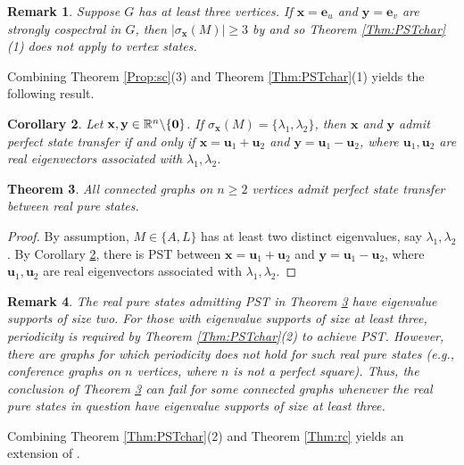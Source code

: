 \documentclass[11pt]{article}
\newtheorem{theorem}{Theorem}
\newtheorem{corollary}[theorem]{Corollary}
\newtheorem{remark}[theorem]{Remark}
\newcommand{\zero}{{\bf{0}}}
\newcommand{\be}{\mathbf e}
\newcommand{\bx}{\mathbf x}
\newcommand{\by}{\mathbf y}
\newcommand{\bu}{\mathbf u}
\def\R{\mathbb{R}}
\begin{document}
\begin{remark}
Suppose $G$ has at least three vertices. If $\bx=\be_u$ and $\by=\be_v$ are strongly cospectral in $G$, then $|\sigma_{\bx}(M)|\geq 3$ by \cite[Theorem 3.4]{MonterdeELA} and so Theorem \ref{Thm:PSTchar}(1) does not apply to vertex states.
\end{remark}

Combining Theorem \ref{Prop:sc}(3) and Theorem \ref{Thm:PSTchar}(1) yields the following result.

\begin{corollary}
\label{Cor:size2}
Let $\bx,\by \in \R^n\backslash\{\zero\}$. If $\sigma_{\bx}(M)=\{\lambda_1,\lambda_2\}$, then $\bx$ and $\by$ admit perfect state transfer if and only if $\bx=\bu_1+\bu_2$ and $\by=\bu_1-\bu_2$, where $\bu_1,\bu_2$ are real eigenvectors associated with $\lambda_1,\lambda_2$.
\end{corollary}

\begin{theorem}
\label{Thm:allgraphs}
All connected graphs on $n\geq 2$ vertices admit perfect state transfer between real pure states.
\end{theorem}

\begin{proof}
By assumption, $M\in\{A,L\}$ has at least two distinct eigenvalues, say $\lambda_1,\lambda_2$. By Corollary \ref{Cor:size2}, there is PST  between $\bx=\bu_1+\bu_2$ and $\by=\bu_1-\bu_2$, where $\bu_1,\bu_2$ are real eigenvectors associated with $\lambda_1,\lambda_2$.
\end{proof}

\begin{remark}
The real pure states admitting PST in Theorem \ref{Thm:allgraphs} have eigenvalue supports of size two. For those with eigenvalue supports of size at least three, periodicity is required by Theorem \ref{Thm:PSTchar}(2) to achieve PST. However, there are graphs for which periodicity does not hold for such real pure states (e.g., conference graphs on $n$ vertices, where $n$ is not a perfect square).
Thus, the conclusion of Theorem \ref{Thm:allgraphs} can fail for some connected graphs whenever the real pure states in question have eigenvalue supports of size at least three.
\end{remark}

Combining Theorem \ref{Thm:PSTchar}(2) and Theorem \ref{Thm:rc} yields an extension of \cite[Theorem 2.4.4]{Coutinho2014}.
\end{document}
